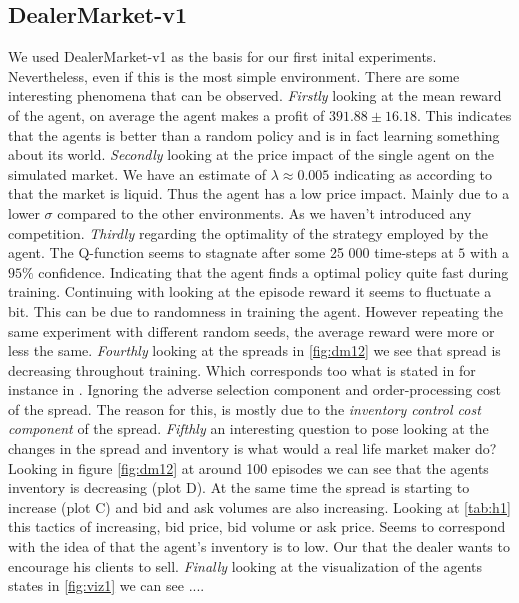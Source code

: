 \documentclass{kththesis}
\theoremstyle{definition}
\begin{document}
\subsection*{DealerMarket-v1}
We used DealerMarket-v1 as the basis for our first inital experiments. Nevertheless, even if this is the most simple environment. There are some interesting phenomena that can be observed. \textit{Firstly} looking at the mean reward of the agent, on average the agent makes a profit of $391.88 \pm 16.18$. This indicates that the agents is better than a random policy and is in fact learning something about its world.
\newline
\newline
\textit{Secondly} looking at the price impact of the single agent on the simulated market. We have an estimate of $\lambda \approx 0.005$ indicating as according to \parencite{cartea2015algorithmic} that the market is liquid. Thus the agent has a low price impact. Mainly due to a lower $\sigma$ compared to the other environments. As we haven't introduced any competition. \textit{Thirdly} regarding the optimality of the strategy employed by the agent. The Q-function seems to stagnate after some 25 000 time-steps at $5$ with a $95\%$ confidence. Indicating that the agent finds a optimal policy quite fast during training.
\newline
\newline
Continuing with looking at the episode reward it seems to fluctuate a bit. This can be due to randomness in training the agent. However repeating the same experiment with different random seeds, the average reward were more or less the same. \textit{Fourthly} looking at the spreads in \autoref{fig:dm12} we see that spread is decreasing throughout training. Which corresponds too what is stated in for instance  in \parencite{foucault2013market}. Ignoring the adverse selection component and order-processing cost of the spread. 
\newline
\newline
The reason for this, is mostly due to the \textit{inventory control cost component} of the spread. \textit{Fifthly} an interesting question to pose looking at the changes in the spread and inventory is what would a real life market maker do? Looking in figure \autoref{fig:dm12} at around 100 episodes we can see that the agents inventory is decreasing (plot D). At the same time the spread is starting to increase (plot C) and bid and ask volumes are also increasing. Looking at \autoref{tab:h1} this tactics of increasing, bid price, bid volume or ask price. Seems to correspond with the idea of that the agent's inventory is to low. Our that the dealer wants to encourage his clients to sell. \textit{Finally} looking at the visualization of the agents states in \autoref{fig:viz1} we can see ....
\end{document}

